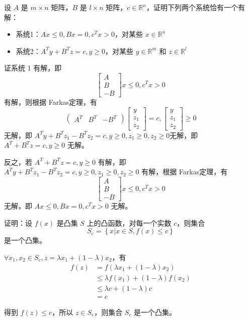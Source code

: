 \begin{problem}
    设 $A$ 是 $m\times n$ 矩阵，$B$ 是 $l \times n$ 矩阵，$c\in\mathbb{R}^n$，证明下列两个系统恰有一个有解：
    \begin{itemize}
        \item 系统1：$Ax \le 0, Bx = 0, c^Tx > 0$，对某些 $x\in\mathbb{R}^n$
        \item 系统2：$A^Ty + B^Tz = c, y \ge 0$，对某些 $y \in \mathbb{R}^m$ 和 $z\in\mathbb{R}^l$
    \end{itemize}  
\end{problem}
\begin{solution}
    证系统 1 有解，即
    \[\begin{bmatrix}
        A\\
        B\\
        -B
    \end{bmatrix}x\le 0, c^Tx>0\]
    有解，则根据 Farkas定理，有
    \[\begin{pmatrix}
        A^T & B^T & -B^T
    \end{pmatrix}\begin{bmatrix}
        y\\
        z_1\\
        z_2
    \end{bmatrix}=c,\begin{bmatrix}
        y\\
        z_1\\
        z_2
    \end{bmatrix}\ge 0\]
    无解，即 $A^Ty + B^Tz_1 - B^Tz_2 = c, y\ge 0, z_1\ge 0, z_2\ge 0$无解，即 $A^T + B^Tz = c, y\ge 0$ 无解。

    反之，若 $A^T + B^Tz = c, y\ge 0$ 有解，即 $A^Ty + B^Tz_1 - B^Tz_2 = c, y\ge 0, z_1\ge 0, z_2\ge 0$ 有解，根据 Farkas定理，有 
    \[\begin{bmatrix}
        A\\
        B\\
        -B
    \end{bmatrix}x\le 0, c^Tx>0\]
    无解，即 $Ax \le 0, Bx = 0, c^Tx > 0$ 无解。
\end{solution}

\begin{problem}
    证明：设 $f(x)$ 是凸集 $S$ 上的凸函数，对每一个实数 $c$，则集合 \[S_c=\left\{x|x\in S, f(x) \le c\right\}\] 是一个凸集。
\end{problem}
\begin{solution}
    $\forall x_1, x_2 \in S_c, z = \lambda x_1 + (1 - \lambda) x_2$，有 
    \begin{align*}
        f(z) &= f(\lambda x_1 + (1 - \lambda) x_2) \\
        &\le \lambda f(x_1) + (1 - \lambda)f(x_2)\\
        &\le \lambda c + (1 - \lambda)c \\
        &= c
    \end{align*}

    得到 $f(z) \le c$，所以 $z \in S_c$，则集合 $S_c$ 是一个凸集。 
\end{solution}

